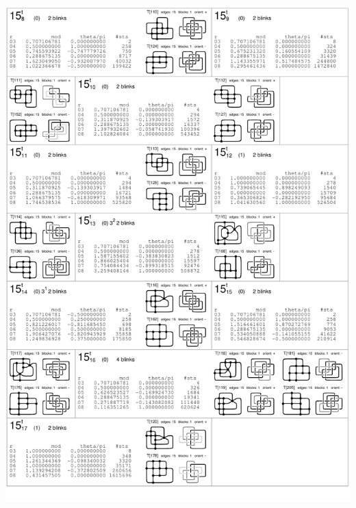 \begin{center}
 \includegraphics[height=23.5cm]{E.figsbw2/con3catalog008_bw.pdf} \eject 

\end{center}
